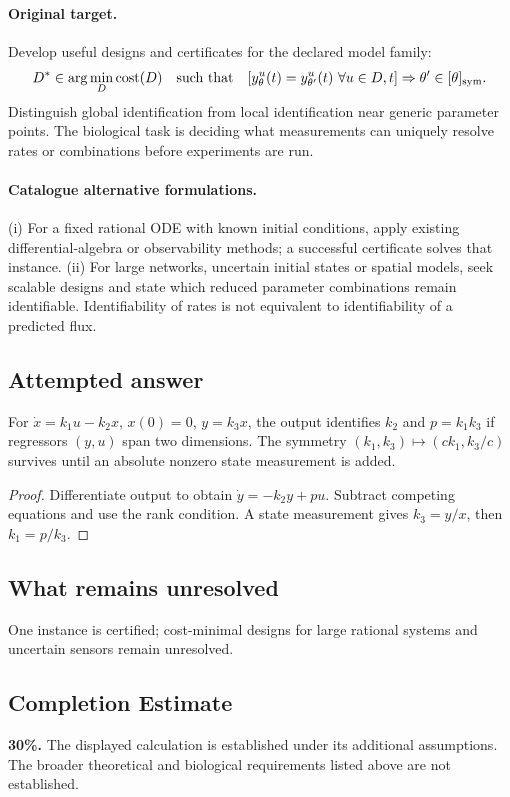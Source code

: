 \documentclass[11pt]{article}
\begin{document}
\paragraph{Original target.}
Develop useful designs and certificates for the declared model family:
\[
D^*\in\arg\min_D\mathrm{cost}(D)
\quad\text{such that}\quad
[y_\theta^u(t)=y_{\theta'}^u(t)\ \forall u\in D,t]\Rightarrow\theta'\in[\theta]_{\rm sym}.
\]
Distinguish global identification from local identification near generic parameter points. The biological task is deciding what measurements can uniquely resolve rates or combinations before experiments are run.
\paragraph{Catalogue alternative formulations.}
(i) For a fixed rational ODE with known initial conditions, apply existing differential-algebra or observability methods; a successful certificate solves that instance. (ii) For large networks, uncertain initial states or spatial models, seek scalable designs and state which reduced parameter combinations remain identifiable. Identifiability of rates is not equivalent to identifiability of a predicted flux.
\subsection{Attempted answer}
\begin{proposition}
For $\dot x=k_1u-k_2x$, $x(0)=0$, $y=k_3x$, the output identifies $k_2$ and $p=k_1k_3$ if regressors $(y,u)$ span two dimensions. The symmetry $(k_1,k_3)\mapsto(ck_1,k_3/c)$ survives until an absolute nonzero state measurement is added.
\end{proposition}
\begin{proof}
Differentiate output to obtain $\dot y=-k_2y+pu$. Subtract competing equations and use the rank condition. A state measurement gives $k_3=y/x$, then $k_1=p/k_3$.
\end{proof}
\subsection{What remains unresolved}
One instance is certified; cost-minimal designs for large rational systems and uncertain sensors remain unresolved.
\subsection{Completion Estimate}
\textbf{30\%.} The displayed calculation is established under its additional assumptions. The broader theoretical and biological requirements listed above are not established.
\end{document}
